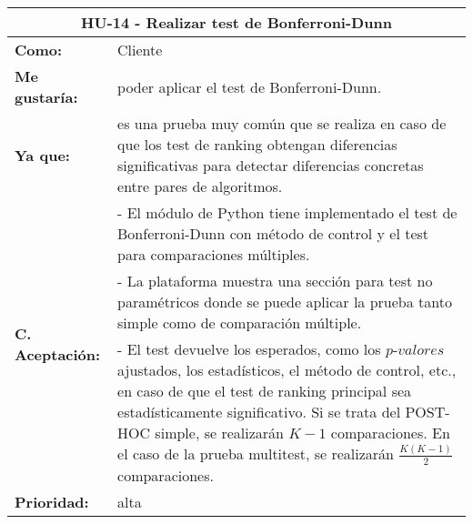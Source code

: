 
\begin{table}[H]
	\begin{tabular}{| p{3cm}| p{11cm} |}
		\hline
		\multicolumn{2}{|c|}{\textbf{HU-14} - Realizar test de Bonferroni-Dunn} \\ \hline
		\textbf{Como:} & Cliente \\ \hline
		\textbf{Me gustaría:} & poder aplicar el test de Bonferroni-Dunn. \\ \hline
		\textbf{Ya que:} & es una prueba muy común que se realiza en caso de que los test de ranking obtengan diferencias significativas para detectar diferencias concretas entre pares de algoritmos. \\ \hline
		\multirow{3}{11cm}{\textbf{C. Aceptación:}} & - El módulo de Python tiene implementado el test de Bonferroni-Dunn con método de control y el test para comparaciones múltiples. \\
		& - La plataforma muestra una sección para test no paramétricos donde se puede aplicar la prueba tanto simple como de comparación múltiple. \\
		& - El test devuelve los esperados, como los $\textit{p-valores}$ ajustados, los estadísticos, el método de control, etc., en caso de que el test de ranking principal sea estadísticamente significativo. Si se trata del POST-HOC simple, se realizarán $K-1$ comparaciones. En el caso de la prueba multitest, se realizarán $\frac{K(K-1)}{2}$ comparaciones. \\ \hline
		\textbf{\textbf{Prioridad:}} & alta \\ \hline
	\end{tabular}
\end{table}


